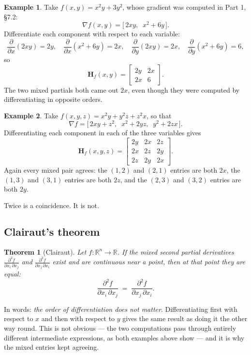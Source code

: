 \documentclass[11pt]{article}
\theoremstyle{plain}
\newtheorem{thm}{Theorem}[section]
\theoremstyle{definition}
\newtheorem{ex}{Example}[section]
\theoremstyle{remark}
\newcommand{\R}{\mathbb{R}}
\newcommand{\grad}{\nabla}
\newcommand{\pd}[2]{\frac{\partial #1}{\partial #2}}
\newcommand{\mt}[1]{\mathbf{#1}}          %
\newcommand{\pdd}[3]{\frac{\partial^{2} #1}{\partial #2\,\partial #3}}
\begin{document}
\begin{ex}
Take $f(x,y)=x^{2}y+3y^{2}$, whose gradient was computed in Part 1, \S7.2:
\[
  \grad f(x,y) = \bigl[\,2xy,\;\;x^{2}+6y\,\bigr] .
\]
Differentiate each component with respect to each variable:
\[
  \pd{}{x}(2xy)=2y,\quad
  \pd{}{x}(x^{2}+6y)=2x,\quad
  \pd{}{y}(2xy)=2x,\quad
  \pd{}{y}(x^{2}+6y)=6,
\]
so
\[
  \mt{H}_{f}(x,y)=
  \begin{bmatrix}
    2y & 2x\\
    2x & 6
  \end{bmatrix} .
\]
The two mixed partials both came out $2x$, even though they were computed by
differentiating in opposite orders.
\end{ex}

\begin{ex}
Take $f(x,y,z)=x^{2}y+y^{2}z+z^{2}x$, so that
\[
  \grad f = \bigl[\,2xy+z^{2},\;\;x^{2}+2yz,\;\;y^{2}+2zx\,\bigr] .
\]
Differentiating each component in each of the three variables gives
\[
  \mt{H}_{f}(x,y,z)=
  \begin{bmatrix}
    2y & 2x & 2z\\
    2x & 2z & 2y\\
    2z & 2y & 2x
  \end{bmatrix} .
\]
Again every mixed pair agrees: the $(1,2)$ and $(2,1)$ entries are both $2x$,
the $(1,3)$ and $(3,1)$ entries are both $2z$, and the $(2,3)$ and $(3,2)$
entries are both $2y$.
\end{ex}

\noindent Twice is a coincidence. It is not.

\subsection{Clairaut's theorem}
\begin{thm}[Clairaut]
Let $f:\R^{n}\to\R$. If the mixed second partial derivatives
$\pdd{f}{x_i}{x_j}$ and $\pdd{f}{x_j}{x_i}$ exist and are \emph{continuous} near
a point, then at that point they are equal:
\[
  \pdd{f}{x_i}{x_j} \;=\; \pdd{f}{x_j}{x_i} .
\]
\end{thm}

\noindent In words: \emph{the order of differentiation does not matter}.
Differentiating first with respect to $x$ and then with respect to $y$ gives the
same result as doing it the other way round. This is not obvious --- the two
computations pass through entirely different intermediate expressions, as both
examples above show --- and it is why the mixed entries kept agreeing.
\end{document}
